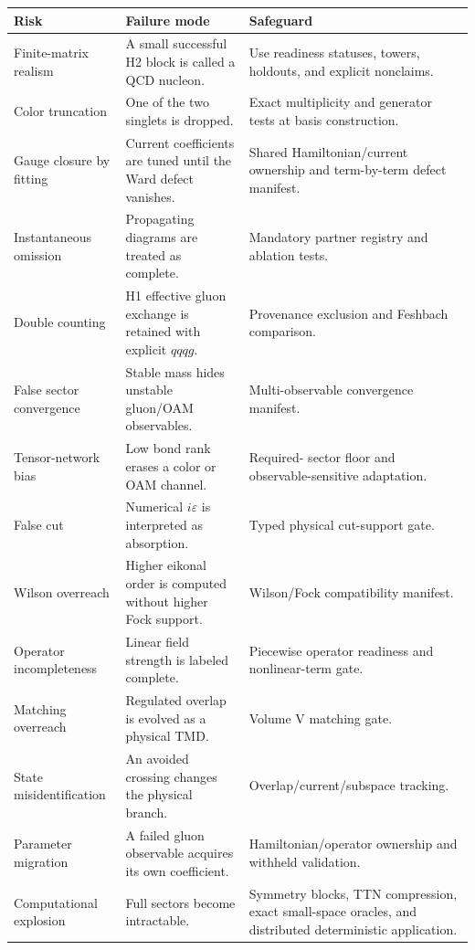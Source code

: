 \documentclass[11pt]{article}
\newcommand{\eps}{\varepsilon}
\begin{document}
\begin{longtable}{L{0.25\textwidth}L{0.34\textwidth}L{0.33\textwidth}}
\toprule
Risk & Failure mode & Safeguard\\
\midrule
\endhead
Finite-matrix realism & A small successful H2 block is called a QCD nucleon. &
Use readiness statuses, towers, holdouts, and explicit nonclaims.\\
Color truncation & One of the two singlets is dropped. & Exact multiplicity and
generator tests at basis construction.\\
Gauge closure by fitting & Current coefficients are tuned until the Ward defect
vanishes. & Shared Hamiltonian/current ownership and term-by-term defect
manifest.\\
Instantaneous omission & Propagating diagrams are treated as complete. &
Mandatory partner registry and ablation tests.\\
Double counting & H1 effective gluon exchange is retained with explicit
\(qqqg\). & Provenance exclusion and Feshbach comparison.\\
False sector convergence & Stable mass hides unstable gluon/OAM observables. &
Multi-observable convergence manifest.\\
Tensor-network bias & Low bond rank erases a color or OAM channel. & Required-
sector floor and observable-sensitive adaptation.\\
False cut & Numerical \(i\eps\) is interpreted as absorption. & Typed physical
cut-support gate.\\
Wilson overreach & Higher eikonal order is computed without higher Fock
support. & Wilson/Fock compatibility manifest.\\
Operator incompleteness & Linear field strength is labeled complete. & Piecewise
operator readiness and nonlinear-term gate.\\
Matching overreach & Regulated overlap is evolved as a physical TMD. & Volume V
matching gate.\\
State misidentification & An avoided crossing changes the physical branch. &
Overlap/current/subspace tracking.\\
Parameter migration & A failed gluon observable acquires its own coefficient. &
Hamiltonian/operator ownership and withheld validation.\\
Computational explosion & Full sectors become intractable. & Symmetry blocks,
TTN compression, exact small-space oracles, and distributed deterministic
application.\\
\bottomrule
\end{longtable}
\end{document}
